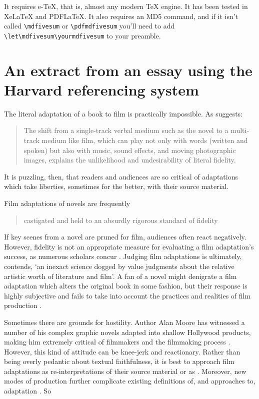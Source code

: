 \documentclass[a4paper,australian,oneside,12pt,footlines=3]{scrbook}%
\theoremstyle{remark}
\begin{document}
It requires e-\TeX, that is, almost any modern \TeX{} engine. 
It has been tested in Xe\LaTeX{} and PDF\LaTeX. 
It also requires an MD5 command, and if it isn't called \verb|\mdfivesum| or \verb|\pdfmdfivesum| you'll need to add \verb|\let\mdfivesum\yourmdfivesum| to your preamble.
%
%
\chapter{An extract from an essay using the Harvard referencing system}
\begin{refsection}
\textelp{} The literal adaptation of a book to film is practically impossible. As \textcite[4]{Stam2005} suggests:
\blockquote{The shift from a single-track verbal medium such as the novel to a multi-track medium like film, which can play not only with words (written and spoken) but also with music, sound effects, and moving photographic images, explains the unlikelihood and \textelp{} undesirability of literal fidelity.}
It is puzzling, then, that readers and audiences are so critical of adaptations which take liberties, sometimes for the better, with their source material.

Film adaptations of novels are frequently 
\blockquote[{\parencite[15]{Stam2005a}}]{castigated and held to an absurdly rigorous standard of fidelity}. 
If key scenes from a novel are pruned for film, audiences often react negatively. However, fidelity is not an appropriate measure for evaluating a film adaptation’s success, as numerous scholars concur \parencite{Desmond2006,Leitch2008,McFarlane1996,Miller2004}. Judging film adaptations is ultimately, \textcite[9]{Whelehan1999} contends, ‘an inexact science dogged by value judgments about the relative artistic worth of literature and film’. A fan of a novel might denigrate a film adaptation which alters the original book in some fashion, but their response is highly subjective and fails to take into account the practices and realities of film production \parencite[26]{McFarlane2007}.

Sometimes there are grounds for hostility. Author Alan Moore has witnessed a number of his complex graphic novels adapted into shallow Hollywood products, making him extremely critical of filmmakers and the filmmaking process \parencite{Ahsurst2009}. However, this kind of attitude can be knee-jerk and reactionary. Rather than being overly pedantic about textual faithfulness, it is best to approach film adaptations as re-interpretations of their source material \parencite[8]{Hutcheon2006} or as 
. %
Moreover, new modes of production further complicate existing definitions of, and approaches to, adaptation \parencite[180]{Moore2010}. So\textelp{}

\printbibliography[heading=subbibliography]
\end{refsection}
\end{document}
